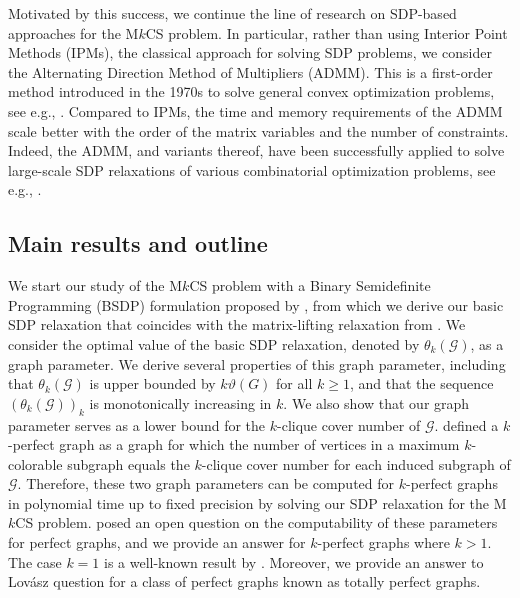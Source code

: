 \documentclass[11pt, a4paper]{article}
\newcommand{\mc}{\mathcal}
\begin{document}
Motivated by this success, we continue the line of research on SDP-based approaches for the M$k$CS problem. 
In particular, rather than using Interior Point Methods (IPMs), the classical approach for solving SDP problems, we consider the Alternating Direction Method of Multipliers (ADMM). 
This is a first-order method introduced in the 1970s to solve general convex optimization problems, see e.g., \cite{Boyd2011ADMMTheory}. 
Compared to IPMs, the time and memory requirements of the ADMM scale better with the order of the matrix variables and the number of constraints.
Indeed, the ADMM, and variants thereof, have been successfully applied to solve large-scale SDP relaxations of various combinatorial optimization problems, see e.g., \cite{Hu2020ADMMQSPP, Li2021PRSMMinCut, Oliveira2018ADMMForQAP, Sinjorgo2025ADMMStability}.

\subsection{Main results and outline}
We start our study of the M$k$CS problem with a Binary Semidefinite Programming (BSDP) formulation proposed by \citet{deMeijer2024BSDP}, from which we derive our basic SDP relaxation that coincides with the matrix-lifting relaxation from \cite{Kuryatnikova2022MkCSProblem}. 
We consider the optimal value of the basic SDP relaxation, denoted by $\theta_k (\mc{G})$, as a graph parameter.
We derive several properties of this graph parameter, including that  $\theta_k (\mc{G})$ is upper bounded by $k \vartheta(G)$ for all $k\geq 1$, and that the sequence $\left( \theta_k(\mc{G}) \right )_k$ is monotonically increasing in $k$. 
We also show that our graph parameter serves as  a lower bound for the $k$-clique cover number of $\mc{G}$.
\citet{lovasz1983perfect} defined a $k$-perfect graph as a graph for which the number of vertices in a maximum $k$-colorable subgraph equals the $k$-clique cover number for each induced subgraph of $\mc{G}$.
Therefore, these two graph parameters can be computed for $k$-perfect graphs in polynomial time up to fixed precision by solving our SDP relaxation for the M$k$CS problem.
\citet{lovasz1983perfect} posed an open question on the computability of these parameters for perfect graphs, and we provide an answer for $k$-perfect graphs where $k>1$. 
The case $k=1$ is a well-known result by \citet{Grtschel1984PolynomialAF}.
Moreover, we provide an answer to  Lov\'asz question for a class of perfect graphs known as totally perfect graphs. 
\end{document}
